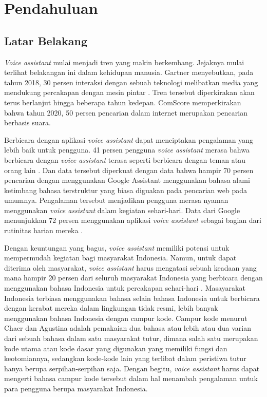 \chapter{Pendahuluan}

\section{Latar Belakang}

\textit{Voice assistant} mulai menjadi tren yang makin berkembang. Jejaknya mulai terlihat belakangan ini dalam kehidupan manusia. Gartner menyebutkan, pada tahun 2018, 30 persen interaksi dengan sebuah teknologi melibatkan media yang mendukung percakapan dengan mesin pintar \parencite{escherich2015market}. Tren tersebut diperkirakan akan terus berlanjut hingga beberapa tahun kedepan. ComScore memperkirakan bahwa tahun 2020, 50 persen pencarian dalam internet merupakan pencarian berbasis suara.

Berbicara dengan aplikasi \textit{voice assistant} dapat menciptakan pengalaman yang lebih baik untuk pengguna. 41 persen pengguna \textit{voice assistant} merasa bahwa berbicara dengan \textit{voice assistant} terasa seperti berbicara dengan teman atau orang lain \parencite{kleinberg2018five}. Dan data tersebut diperkuat dengan data bahwa hampir 70 persen pencarian dengan menggunakan Google Assistant menggunakan bahasa alami ketimbang bahasa terstruktur yang biasa diguakan pada pencarian web pada umumnya. Pengalaman tersebut menjadikan pengguna merasa nyaman menggunakan \textit{voice assistant} dalam kegiatan sehari-hari. Data dari Google menunjukkan 72 persen menggunakan aplikasi \textit{voice assistant} sebagai bagian dari rutinitas harian mereka \parencite{kleinberg2018five}.

Dengan keuntungan yang bagus, \textit{voice assistant} memiliki potensi untuk mempermudah kegiatan bagi masyarakat Indonesia. Namun, untuk dapat diterima oleh masyarakat, \textit{voice assistant} harus mengatasi sebuah keadaan yang mana hampir 20 persen dari seluruh masyarakat Indonesia yang berbicara dengan menggunakan bahasa Indonesia untuk percakapan sehari-hari \parencite{naim2012kewarganegaraan}. Masayarakat Indonesia terbiasa menggunakan bahasa selain bahasa Indonesia untuk berbicara dengan kerabat mereka dalam lingkungan tidak resmi, lebih banyak menggunakan bahasa Indonesia dengan campur kode. Campur kode menurut Chaer dan Agustina \parencite{chaer1995sosiolinguistik} adalah pemakaian dua bahasa atau lebih atau dua varian dari sebuah bahasa dalam satu masyarakat tutur, dimana salah satu merupakan kode utama atau kode dasar yang digunakan yang memiliki fungsi dan keotomiannya, sedangkan kode-kode lain yang terlibat dalam peristiwa tutur hanya berupa serpihan-serpihan saja. Dengan begitu, \textit{voice assistant} harus dapat mengerti bahasa campur kode tersebut dalam hal menambah pengalaman untuk para pengguna berupa masyarakat Indonesia.

